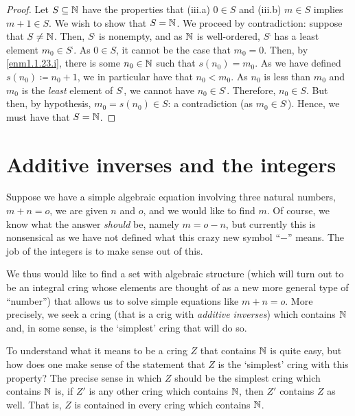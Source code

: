 \begin{thm}
\begin{proof}
Let $S\subseteq \mathbb{N}$ have the properties that (iii.a) $0\in S$ and (iii.b) $m\in S$ implies $m+1\in S$.  We wish to show that $S=\mathbb{N}$.  We proceed by contradiction:  suppose that $S\neq \mathbb{N}$.  Then, $S^{\comp}$ is nonempty, and as $\mathbb{N}$ is well-ordered, $S^{\comp}$ has a least element $m_0\in S^{\comp}$.  As $0\in S$, it cannot be the case that $m_0=0$.  Then, by \ref{enm1.1.23.i}, there is some $n_0\in \mathbb{N}$ such that $s(n_0)=m_0$.  As we have defined $s(n_0)\coloneqq n_0+1$, we in particular have that $n_0<m_0$.  As $n_0$ is less than $m_0$ and $m_0$ is the \emph{least} element of $S^{\comp}$, we cannot have $n_0\in S^{\comp}$.  Therefore, $n_0\in S$.  But then, by hypothesis, $m_0=s(n_0)\in S$:  a contradiction (as $m_0\in S^{\comp}$).  Hence, we must have that $S=\mathbb{N}$.
\end{proof}
\end{thm}

\section{Additive inverses and the integers}

Suppose we have a simple algebraic equation involving three natural numbers, $m+n=o$, we are given $n$ and $o$, and we would like to find $m$.  Of course, we know what the answer \emph{should} be, namely $m=o-n$, but currently this is nonsensical as we have not defined what this crazy new symbol ``$-$'' means.  The job of the integers is to make sense out of this.

We thus would like to find a set with algebraic structure (which will turn out to be an integral cring whose elements are thought of as a new more general type of ``number'') that allows us to solve simple equations like $m+n=o$.  More precisely, we seek a cring (that is a crig with \emph{additive inverses}) which contains $\mathbb{N}$ and, in some sense, is the `simplest' cring that will do so.

To understand what it means to be a cring $Z$ that contains $\mathbb{N}$ is quite easy, but how does one make sense of the statement that $Z$ is the `simplest' cring with this property?  The precise sense in which $Z$ should be the simplest cring which contains $\mathbb{N}$ is, if $Z'$ is any other cring which contains $\mathbb{N}$, then $Z'$ contains $Z$ as well.  That is, $Z$ is contained in every cring which contains $\mathbb{N}$.

